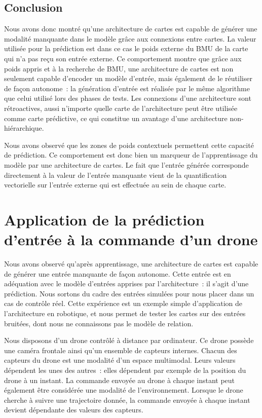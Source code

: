\documentclass[../main]{subfiles}
\begin{document}
\subsection{Conclusion}

Nous avons donc montré qu'une architecture de cartes est capable de générer une modalité manquante dans le modèle grâce aux connexions entre cartes. La valeur utilisée pour la prédiction est dans ce cas le poids externe du BMU de la carte qui n'a pas reçu son entrée externe.
Ce comportement montre que grâce aux poids appris et à la recherche de BMU, une architecture de cartes est non seulement capable d'encoder un modèle d'entrée, mais également de le réutiliser de façon autonome~: la génération d'entrée est réalisée par le même algorithme que celui utilisé lors des phases de tests.
Les connexions d'une architecture sont rétroactives, aussi n'importe quelle carte de l'architecture peut être utilisée comme carte prédictive, ce qui constitue un avantage d'une architecture non-hiérarchique.

Nous avons observé que les zones de poids contextuels permettent cette capacité de prédiction. Ce comportement est donc bien un marqueur de l'apprentissage du modèle par une architecture de cartes. Le fait que l'entrée générée corresponde directement à la valeur de l'entrée manquante vient de la quantification vectorielle sur l'entrée externe qui est effectuée au sein de chaque carte.

\section{Application de la prédiction d'entrée à la commande d'un drone}


Nous avons observé qu'après apprentissage, une architecture de cartes est capable de générer une entrée manquante de façon autonome. Cette entrée est en adéquation avec le modèle d'entrées apprises par l'architecture~: il s'agit d'une prédiction.
Nous sortons du cadre des entrées simulées pour nous placer dans un cas de contrôle réel. Cette expérience est un exemple simple d'application de l'architecture en robotique, et nous permet de tester les cartes sur des entrées bruitées, dont nous ne connaissons pas le modèle de relation.

Nous disposons d'un drone contrôlé à distance par ordinateur. Ce drone possède une caméra frontale ainsi qu'un ensemble de capteurs internes. Chacun des capteurs du drone est une modalité d'un espace multimodal. Leurs valeurs dépendent les unes des autres~: elles dépendent par exemple de la position du drone à un instant.
La commande envoyée au drone à chaque instant peut également être considérée une modalité de l'environnement. 
Lorsque le drone cherche à suivre une trajectoire donnée, la commande envoyée à chaque instant devient dépendante des valeurs des capteurs.
\end{document}
